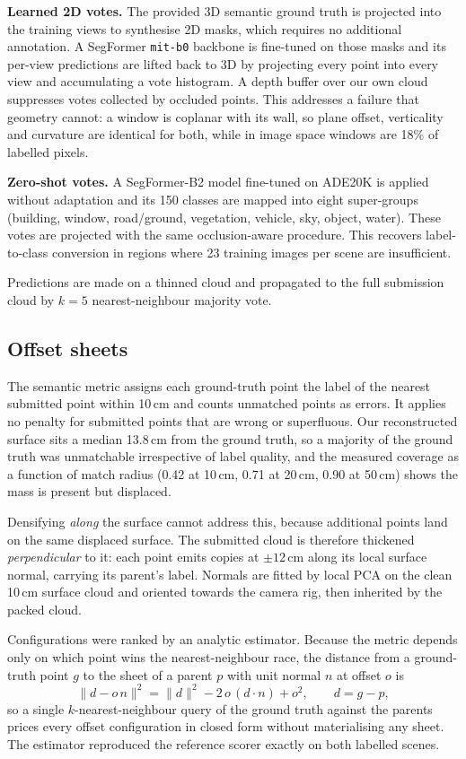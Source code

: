 \documentclass[10pt,twocolumn,letterpaper]{article}
\begin{document}
\textbf{Learned 2D votes.} The provided 3D semantic ground truth is projected
into the training views to synthesise 2D masks, which requires no additional
annotation. A SegFormer \texttt{mit-b0} backbone is fine-tuned on those masks and
its per-view predictions are lifted back to 3D by projecting every point into
every view and accumulating a vote histogram. A depth buffer over our own cloud
suppresses votes collected by occluded points. This addresses a failure that
geometry cannot: a window is coplanar with its wall, so plane offset,
verticality and curvature are identical for both, while in image space windows
are 18\% of labelled pixels.

\textbf{Zero-shot votes.} A SegFormer-B2 model fine-tuned on ADE20K is applied
without adaptation and its 150 classes are mapped into eight super-groups
(building, window, road/ground, vegetation, vehicle, sky, object, water). These
votes are projected with the same occlusion-aware procedure. This recovers
label-to-class conversion in regions where 23 training images per scene are
insufficient.

Predictions are made on a thinned cloud and propagated to the full submission
cloud by $k{=}5$ nearest-neighbour majority vote.

\subsection{Offset sheets}

The semantic metric assigns each ground-truth point the label of the nearest
submitted point within 10\,cm and counts unmatched points as errors. It applies
no penalty for submitted points that are wrong or superfluous. Our reconstructed
surface sits a median 13.8\,cm from the ground truth, so a majority of the
ground truth was unmatchable irrespective of label quality, and the measured
coverage as a function of match radius (0.42 at 10\,cm, 0.71 at 20\,cm, 0.90 at
50\,cm) shows the mass is present but displaced.

Densifying \emph{along} the surface cannot address this, because additional
points land on the same displaced surface. The submitted cloud is therefore
thickened \emph{perpendicular} to it: each point emits copies at $\pm12$\,cm
along its local surface normal, carrying its parent's label. Normals are fitted
by local PCA on the clean 10\,cm surface cloud and oriented towards the camera
rig, then inherited by the packed cloud.

Configurations were ranked by an analytic estimator. Because the metric depends
only on which point wins the nearest-neighbour race, the distance from a
ground-truth point $g$ to the sheet of a parent $p$ with unit normal $n$ at
offset $o$ is
\[
\|d - o\,n\|^2 = \|d\|^2 - 2\,o\,(d\!\cdot\!n) + o^2, \qquad d = g - p ,
\]
so a single $k$-nearest-neighbour query of the ground truth against the parents
prices every offset configuration in closed form without materialising any
sheet. The estimator reproduced the reference scorer exactly on both labelled
scenes.
\end{document}
